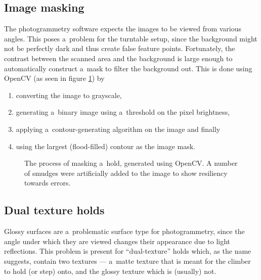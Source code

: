 \subsection{Image masking}
The photogrammetry software expects the images to be viewed from various angles.
This poses a~problem for the turntable setup, since the background might not be perfectly dark and thus create false feature points.
Fortunately, the contrast between the scanned area and the background is large enough to automatically construct a~mask to filter the background out.
This is done using OpenCV \cite{opencv} (as seen in figure \ref{fig:mask}) by
\begin{enumerate}
	\item converting the image to grayscale,
	\item generating a~binary image using a~threshold on the pixel brightness,
	\item applying a~contour-generating algorithm \cite{suzuki1985topological} on the image and finally
	\item using the largest (flood-filled) contour as the image mask.
\end{enumerate}

\begin{figure}[h]
	\centering
	\hfill
	\hfill
	\hfill
	\hfill
	\caption{The process of masking a~hold, generated using OpenCV. A number of smudges were artificially added to the image to show resiliency towards errors.}%
	\label{fig:mask}
\end{figure}

\subsection{Dual texture holds}\label{sec:dual}
Glossy surfaces are a~problematic surface type for photogrammetry, since the angle under which they are viewed changes their appearance due to light reflections.
This problem is present for ``dual-texture'' holds which, as the name suggests, contain two textures --- a~matte texture that is meant for the climber to hold (or step) onto, and the glossy texture which is (usually) not.

